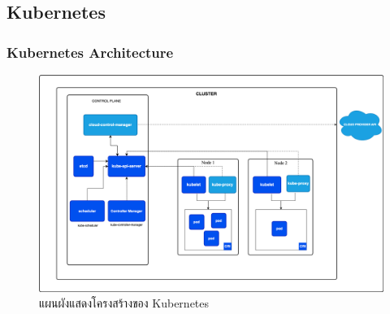 \subsection{Kubernetes}
\subsubsection{Kubernetes Architecture}
\begin{figure}[ht]
    \begin{center}
        \includegraphics[scale=0.2]{images/kube_arc.png}
    \end{center}
    \caption[แผนผังแสดงโครงสร้างของ Kubernetes]{แผนผังแสดงโครงสร้างของ Kubernetes}
\end{figure}

